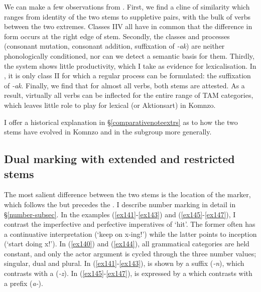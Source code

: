 We can make a few observations from . First, we find a cline of similarity which ranges from identity of the two stems to suppletive pairs, with the bulk of verbs between the two extremes. Classes II\textendash{}V all have in common that the difference in form occurs at the right edge of stem. Secondly, the classes and processes (consonant mutation, consonant addition, suffixation of \emph{-ak}) are neither phonologically conditioned, nor can we detect a semantic basis for them. Thirdly, the system shows little productivity, which I take as evidence for lexicalisation. In , it is only class II for which a regular process can be formulated: the suffixation of \emph{-ak}. Finally, we find that for almost all verbs, both stems are attested. As a result, virtually all verbs can be inflected for the entire range of TAM categories, which leaves little role to play for lexical  (or Aktionsart) in Komnzo.

I offer a historical explanation in {\S}\ref{comparativenoteextrs} as to how the two stems have evolved in Komnzo and in the  subgroup more generally.

\subsection{Dual marking with extended and restricted stems} \label{dualextrs}

The most salient difference between the two stems is the location of the  marker, which follows the  but precedes the . I describe number marking in detail in {\S}\ref{number-subsec}. In the examples (\ref{ex141}-\ref{ex143}) and (\ref{ex145}-\ref{ex147}), I contrast the imperfective and perfective imperatives of `hit'. The former often has a continuative interpretation (`keep on x-ing!') while the latter points to inception (`start doing x!'). In (\ref{ex140}) and (\ref{ex144}), all grammatical categories are held constant, and only the actor argument is cycled through the three number values; singular, dual and plural. In (\ref{ex141}-\ref{ex143}),  is shown by a suffix (\emph{-n}), which contrasts with a  (\emph{-z}). In (\ref{ex145}-\ref{ex147}),  is expressed by a  which contrasts with a  prefix (\emph{a-}).

